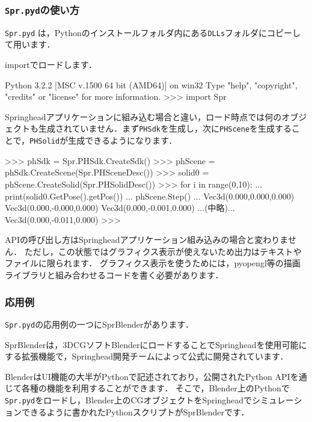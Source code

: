 \subsubsection*{\texttt{Spr.pyd}\KLUDGE の使い方}

\texttt{Spr.pyd} \KLUDGE は，Python\KLUDGE のインストールフォルダ内にある\texttt{DLLs}\KLUDGE フォルダにコピーして用います．

import\KLUDGE でロードします．
\begin{sourcecode}
Python 3.2.2 [MSC v.1500 64 bit (AMD64)] on win32
Type "help", "copyright", "credits" or "license" for more information.
>>> import Spr
\end{sourcecode}

Springhead\KLUDGE アプリケーションに組み込む場合と違い，ロード時点では何のオブジェクトも生成されていません．まず\texttt{PHSdk}\KLUDGE を生成し，次に\texttt{PHScene}\KLUDGE を生成することで，\texttt{PHSolid}\KLUDGE が生成できるようになります．
\begin{sourcecode}
>>> phSdk = Spr.PHSdk.CreateSdk()
>>> phScene = phSdk.CreateScene(Spr.PHSceneDesc())
>>> solid0 = phScene.CreateSolid(Spr.PHSolidDesc())
>>> for i in range(0,10):
...     print(solid0.GetPose().getPos())
...     phScene.Step()
... 
Vec3d(0.000,0.000,0.000)
Vec3d(0.000,-0.000,0.000)
Vec3d(0.000,-0.001,0.000)
...(中略)...
Vec3d(0.000,-0.011,0.000)
>>>
\end{sourcecode}

API\KLUDGE の呼び出し方はSpringhead\KLUDGE アプリケーション組み込みの場合と変わりません．
\KLUDGE ただし，この状態ではグラフィクス表示が使えないため出力はテキストやファイルに限られます．
\KLUDGE グラフィクス表示を使うためには，pyopengl\KLUDGE 等の描画ライブラリと組み合わせるコードを書く必要があります．


\subsubsection*{\KLUDGE 応用例}

\texttt{Spr.pyd}\KLUDGE の応用例の一つにSprBlender\KLUDGE があります．

\begin{center}
\end{center}

SprBlender\KLUDGE は，3DCG\KLUDGE ソフトBlender\KLUDGE にロードすることでSpringhead\KLUDGE を使用可能にする拡張機能で，Springhead\KLUDGE 開発チームによって公式に開発されています．

Blender\KLUDGE はUI\KLUDGE 機能の大半がPython\KLUDGE で記述されており，公開されたPython API\KLUDGE を通じて各種の機能を利用することができます．
\KLUDGE そこで，Blender\KLUDGE 上のPython\KLUDGE で\texttt{Spr.pyd}\KLUDGE をロードし，Blender\KLUDGE 上のCG\KLUDGE オブジェクトをSpringhead\KLUDGE でシミュレーションできるように書かれたPython\KLUDGE スクリプトがSprBlender\KLUDGE です．

